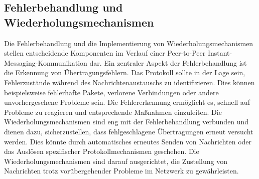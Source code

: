 \subsection{Fehlerbehandlung und Wiederholungsmechanismen}

Die Fehlerbehandlung und die Implementierung von Wiederholungsmechanismen stellen entscheidende Komponenten im Verlauf einer Peer-to-Peer Instant-Messaging-Kommunikation dar. Ein zentraler Aspekt der Fehlerbehandlung ist die Erkennung von Übertragungsfehlern. Das Protokoll sollte in der Lage sein, Fehlerzustände während des Nachrichtenaustauschs zu identifizieren. Dies können beispielsweise fehlerhafte Pakete, verlorene Verbindungen oder andere unvorhergesehene Probleme sein. Die Fehlererkennung ermöglicht es, schnell auf Probleme zu reagieren und entsprechende Maßnahmen einzuleiten. Die Wiederholungsmechanismen sind eng mit der Fehlerbehandlung verbunden und dienen dazu, sicherzustellen, dass fehlgeschlagene Übertragungen erneut versucht werden. Dies könnte durch automatisches erneutes Senden von Nachrichten oder das Auslösen spezifischer Protokollmechanismen geschehen. Die Wiederholungsmechanismen sind darauf ausgerichtet, die Zustellung von Nachrichten trotz vorübergehender Probleme im Netzwerk zu gewährleisten.